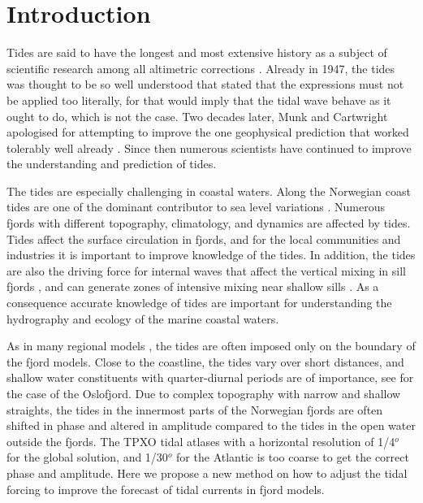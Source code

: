 \section{Introduction}

Tides are said to have the longest and most extensive history as a subject of scientific research among all altimetric corrections \cite[]{egbert94,cartwright77,hendershott81}. Already in 1947, the tides was thought to be so well understood that \cite{unna47} stated that the expressions must not be applied too literally, for that would imply that the tidal wave behave as it ought to do, which is not the case. Two decades later, Munk and Cartwright apologised for attempting to improve the one geophysical prediction that worked tolerably well already \cite[]{munk66}. Since then numerous scientists have continued to improve the understanding and prediction of tides. 

The tides are especially challenging in coastal waters. Along the Norwegian coast tides are one of the dominant contributor to sea level variations \cite[]{grabbe09}. Numerous fjords with different topography, climatology, and dynamics are affected by tides. Tides affect the surface circulation in fjords, and for the local communities and industries it is important to improve knowledge of the tides. In addition, the tides are also the driving force for internal waves that affect the vertical mixing in sill fjords \cite[]{stigeb76},
and can generate zones of intensive mixing near shallow sills \cite[]{staal15}.
As a consequence accurate knowledge of tides are important for understanding the hydrography and ecology of the marine coastal waters.

As in many regional models \cite[]{gjevik89}, the tides are often imposed only on the boundary of the fjord models. Close to the coastline, the tides vary over short distances, and shallow water constituents with quarter-diurnal periods are of importance, see \cite{trygg74} for the case of the Oslofjord. Due to complex topography with narrow and shallow straights, 
the tides in the innermost parts of the Norwegian fjords are often shifted in phase and altered in amplitude compared to the tides in the open water outside the fjords. The TPXO tidal atlases with a horizontal resolution of 1/4$^o$ for the global solution, and 1/30$^o$ for the Atlantic \cite[]{egbert94,egbert02} is too coarse to get the correct phase and amplitude. Here we propose a new method on how to adjust the tidal forcing to improve the forecast of tidal currents in fjord models. 
